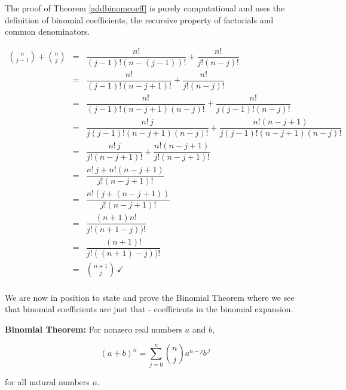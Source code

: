 \documentclass{ximera}
\begin{document}
\smallskip

The proof of Theorem \ref{addbinomcoeff} is purely computational and uses the definition of binomial coefficients, the recursive property of factorials and common denominators.

\[ \begin{array}{rcl}

\displaystyle{\binom{n}{j-1} + \binom{n}{j}} & = & \dfrac{n!}{(j-1)! (n-(j-1))!} + \dfrac{n!}{j! (n-j)!}  \\ [15pt]

& = & \dfrac{n!}{(j-1)! (n-j+1)!} + \dfrac{n!}{j! (n-j)!}  \\ [15pt]

& = & \dfrac{n!}{(j-1)! (n-j+1)(n-j)!} + \dfrac{n!}{j(j-1)! (n-j)!}  \\ [15pt]

& = & \dfrac{n! \, j}{j(j-1)! (n-j+1)(n-j)!} + \dfrac{n! (n-j+1)}{j(j-1)! (n-j+1)(n-j)!} \\ [15pt]

& = & \dfrac{n! \, j}{j! (n-j+1)!} + \dfrac{n! (n-j+1)}{j! (n-j+1)!} \\ [15pt]

& = & \dfrac{n! \, j + n! (n-j+1)}{j! (n-j+1)!} \\ [15pt]

& = & \dfrac{n!\left( j + (n-j+1)\right)}{j! (n-j+1)!} \\ [15pt]

& = & \dfrac{(n+1) n!}{j! (n+1-j))!} \\ [15pt] 

& = & \dfrac{(n+1)!} {j! ((n+1)-j))!} \\ [15pt]

& = & \displaystyle{\binom{n+1}{j}} \, \checkmark \\ 

\end{array} \]

We are now in position to state and prove the Binomial Theorem where we see that binomial coefficients are just that - coefficients in the binomial expansion.

\smallskip

\colorbox{ResultColor}{\bbm

\begin{theorem}  \label{BinomialTheorem}  \textbf{Binomial Theorem:}  For nonzero real numbers $a$ and $b$,

\[(a+b)^{n} =\displaystyle{\sum_{j=0}^{n} \binom{n}{j} a^{n-j} b^{\, j}} \]

for all natural numbers $n$.

\end{theorem}

\ebm}
\end{document}
